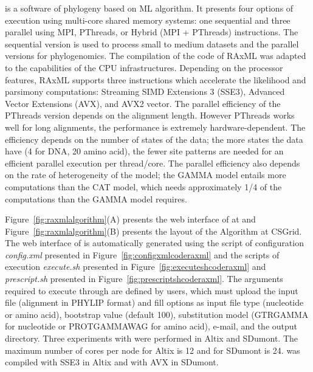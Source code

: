 \vspace{5px}
\noindent
\underline{\textbf{\raxml}} is a software of phylogeny based on ML algorithm. It presents four options of execution using multi-core shared memory systems: one sequential and three parallel using MPI, PThreads, or Hybrid (MPI + PThreads) instructions. The sequential version is used to process small to medium datasets and the parallel versions for phylogenomics. The compilation of the code of RAxML was adapted to the capabilities of the CPU infrastructures. Depending on the processor features, RAxML supports three instructions which accelerate the likelihood and parsimony computations: Streaming SIMD Extensions 3 (SSE3), Advanced Vector Extensions (AVX), and AVX2 vector. The parallel efficiency of the PThreads version depends on the alignment length. However PThreads works well for long alignments, the performance is extremely hardware-dependent. The efficiency depends on the number of states of the data; the more states the data have (4 for DNA, 20 amino acid), the fewer site patterns are needed for an efficient parallel execution per thread/core. The parallel efficiency also depends on the rate of heterogeneity of the model; the GAMMA model entails more computations than the CAT model, which needs approximately 1/4 of the computations than the GAMMA model requires. 

Figure~\ref{fig:raxmlalgorithm}(A) presents the web interface of \raxml at \system and Figure~\ref{fig:raxmlalgorithm}(B) presents the layout of the \raxml Algorithm at CSGrid. The web interface of \raxml is automatically generated using the script of configuration \textit{config.xml} presented in Figure~\ref{fig:configxmlcoderaxml} and the scripts of execution \textit{execute.sh} presented in Figure~\ref{fig:executeshcoderaxml} and \textit{prescript.sh} presented in Figure~\ref{fig:prescriptshcoderaxml}. The arguments required to execute \raxml through \system are defined by users, which must upload the input file (alignment in PHYLIP format) and fill options as input file type (nucleotide or amino acid), bootstrap value (default 100), substitution model (GTRGAMMA for nucleotide or PROTGAMMAWAG for amino acid), e-mail, and the output directory. Three experiments with \raxml were performed in Altix and SDumont. The maximum number of cores per node for Altix is 12 and for SDumont is 24. \raxml was compiled with SSE3 in Altix and with AVX in SDumont.

